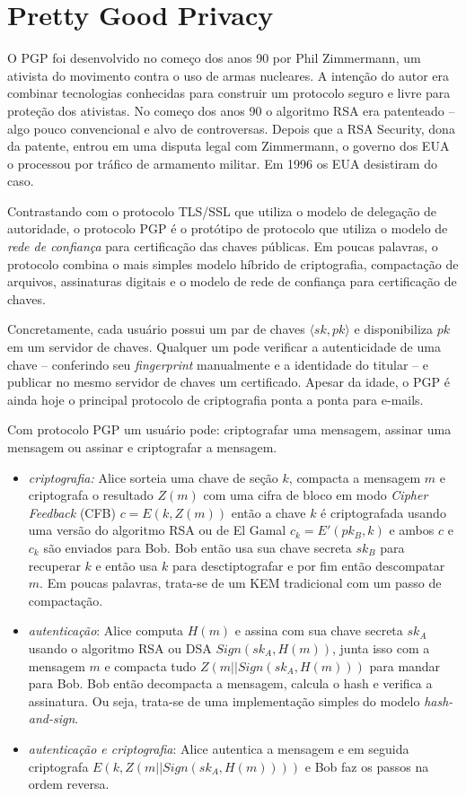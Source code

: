 \section{Pretty Good Privacy}
\label{sec:pgp}

O PGP foi desenvolvido no começo dos anos 90 por Phil Zimmermann, um ativista do movimento contra o uso de armas nucleares.
A intenção do autor era combinar tecnologias conhecidas para construir um protocolo seguro e livre para proteção dos ativistas.
No começo dos anos 90 o algoritmo RSA era patenteado -- algo pouco convencional e alvo de controversas.
Depois que a RSA Security, dona da patente, entrou em uma disputa legal com Zimmermann, o governo dos EUA o processou por tráfico de armamento militar.
Em 1996 os EUA desistiram do caso.

Contrastando com o protocolo TLS/SSL que utiliza o modelo de delegação de autoridade, o protocolo PGP é o protótipo de protocolo que utiliza o modelo de {\em rede de confiança} para certificação das chaves públicas.
Em poucas palavras, o protocolo combina o mais simples modelo híbrido de criptografia, compactação de arquivos, assinaturas digitais e o modelo de rede de confiança para certificação de chaves.

Concretamente, cada usuário possui um par de chaves $\langle sk, pk \rangle$ e disponibiliza $pk$ em um servidor de chaves.
Qualquer um pode verificar a autenticidade de uma chave -- conferindo seu {\em fingerprint} manualmente e a identidade do titular -- e publicar no mesmo servidor de chaves um certificado.
Apesar da idade, o PGP é ainda hoje o principal protocolo de criptografia ponta a ponta para e-mails.

Com protocolo PGP um usuário pode: criptografar uma mensagem, assinar uma mensagem ou assinar e criptografar a mensagem.
\begin{itemize}
\item {\em criptografia:} Alice sorteia uma chave de seção $k$, compacta a mensagem $m$ e criptografa o resultado $Z(m)$ com uma cifra de bloco em modo {\em Cipher Feedback} (CFB) $c = E(k, Z(m))$ então a chave $k$ é criptografada usando uma versão do algoritmo RSA ou de El Gamal $c_k = E'(pk_B, k)$ e ambos $c$ e $c_k$ são enviados para Bob.
  Bob então usa sua chave secreta $sk_B$ para recuperar $k$ e então usa $k$ para desctiptografar e por fim então descompatar $m$.
  Em poucas palavras, trata-se de um KEM tradicional com um passo de compactação.
\item {\em autenticação}: Alice computa $H(m)$ e assina com sua chave secreta $sk_A$ usando o algoritmo RSA ou DSA $Sign(sk_A, H(m))$, junta isso com a mensagem $m$ e compacta tudo $Z(m||Sign(sk_A, H(m)))$ para mandar para Bob.
Bob então decompacta a mensagem, calcula o hash e verifica a assinatura.
Ou seja, trata-se de uma implementação simples do modelo {\em hash-and-sign}.
\item {\em autenticação e criptografia}: Alice autentica a mensagem e em seguida criptografa $E(k, Z(m||Sign(sk_A, H(m))))$ e Bob faz os passos na ordem reversa. 
\end{itemize}

